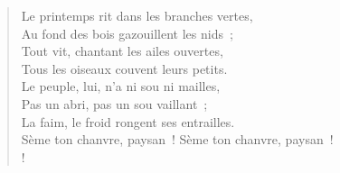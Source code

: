 \documentclass[french,twoside]{book} %
\newenvironment{quoteblock}%
  {\begin{quoting}}
  {\end{quoting}}
\newenvironment{quotebar}{%
    \def\FrameCommand{{\color{rubric!10!}\vrule width 0.5em} \hspace{0.9em}}%
    \def\OuterFrameSep{\itemsep} %
    \MakeFramed {\advance\hsize-\width \FrameRestore}
  }%
  {%
    \endMakeFramed
  }
\renewenvironment{quoteblock}%
  {%
    \savenotes
    \setstretch{0.9}
    \normalfont
    \begin{quotebar}
  }
  {%
    \end{quotebar}
    \spewnotes
  }
\begin{document}
\begin{verse}
\hspace{1em}Le printemps rit dans les branches vertes,\\
\hspace{1em}Au fond des bois gazouillent les nids ;\\
\hspace{1em}Tout vit, chantant les ailes ouvertes,\\
\hspace{1em}Tous les oiseaux couvent leurs petits.\\
\hspace{1em}Le peuple, lui, n’a ni sou ni mailles,\\
\hspace{1em}Pas un abri, pas un sou vaillant ;\\
\hspace{1em}La faim, le froid rongent ses entrailles.\\
Sème ton chanvre, paysan ! Sème ton chanvre, paysan !\\!
\end{verse}
\begin{quoteblock}
 \end{quoteblock}
\end{document}

